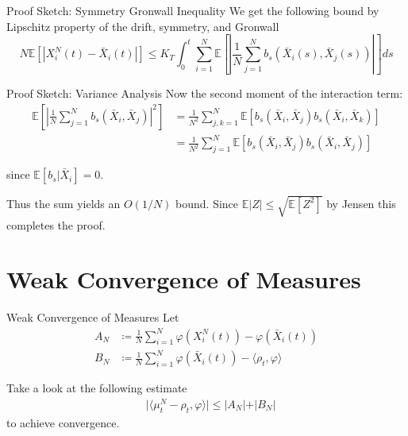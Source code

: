 \documentclass{beamer}
\newcommand{\E}{\mathbb{E}}
\begin{document}
    \begin{frame}{Proof Sketch: Symmetry Gronwall Inequality}
        We get the following bound by Lipschitz property of the drift, symmetry,
        and Gronwall
        \begin{equation*}
            N\mathbb{E}[|X_i^N(t) - \bar{X}_i(t)|] \leq K_T \int_0^t \sum_{i=1}^N \mathbb{E} \left[ \left| \frac{1}{N} \sum_{j=1}^N b_s(\bar X_i(s), \bar X_j(s)) \right| \right] ds
        \end{equation*}
    \end{frame}
    
    \begin{frame}{Proof Sketch: Variance Analysis}
        Now the second moment of the interaction term:
        \begin{align*}
            \mathbb{E} \left[ \left| \frac{1}{N} \sum_{j=1}^N b_s(\bar X_i, \bar X_j)
            \right|^2 \right]
            &= \frac{1}{N^2} \sum_{j,k=1}^N
            \mathbb{E}[b_s(\bar X_i, \bar X_j) b_s(\bar X_i, \bar X_k)]\\
            &=\frac{1}{N^2}\sum_{j=1}^N\E[b_s(\bar X_i, \bar X_j)b_s(\bar X_i, \bar X_j)]
        \end{align*}

        since $\mathbb{E}[b_s | \bar X_i] = 0$.

        \pause
        \bigskip

        Thus the sum yields an $O(1/N)$ bound.
        Since $\E\vert Z\vert \leq \sqrt{\E[Z^2]}$ by Jensen this completes the proof.
    \end{frame}

    \section{Weak Convergence of Measures}

    \begin{frame}{Weak Convergence of Measures}
        Let
        \begin{align*}
            A_N&\coloneq\frac{1}{N}\sum_{i=1}^N\varphi(X_i^N(t))-\varphi(\bar X_i(t))\\
            B_N&\coloneq\frac{1}{N}\sum_{i=1}^N\varphi(\bar X_i(t))-\langle\rho_t,\varphi\rangle
        \end{align*}

        \pause
    
        Take a look at the following estimate
        \begin{align*}
            &\vert\langle\mu_t^N-\rho_t,\varphi\rangle\vert
            \leq \vert A_N\vert + \vert B_N\vert            
        \end{align*}
        to achieve convergence.
    \end{frame}
\end{document}
